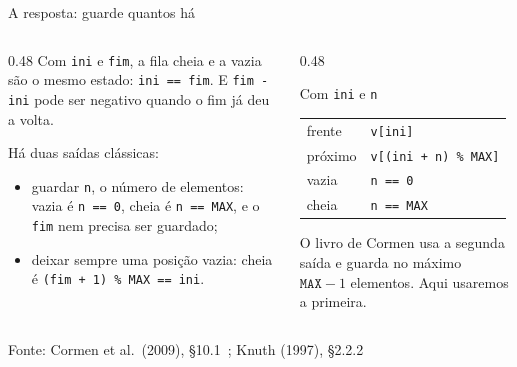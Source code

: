 \documentclass[aspectratio=169]{beamer}
\newcommand{\fonte}[1]{\vfill\hfill{\scriptsize\textcolor{UFSGray}{Fonte: #1}}}
\begin{document}
\begin{frame}{A resposta: guarde quantos há}
  \begin{columns}[T]
    \begin{column}{0.48\textwidth}
      \small Com \texttt{ini} e \texttt{fim}, a fila cheia e a vazia são o
      mesmo estado: \texttt{ini == fim}. E \texttt{fim - ini} pode ser
      negativo quando o fim já deu a volta.

      \medskip
      Há duas saídas clássicas:
      \begin{itemize}
        \item guardar \texttt{n}, o número de elementos: vazia é
          \texttt{n == 0}, cheia é \texttt{n == MAX}, e o \texttt{fim}
          nem precisa ser guardado;
        \item deixar sempre uma posição vazia: cheia é
          \texttt{(fim + 1) \% MAX == ini}.
      \end{itemize}
    \end{column}
    \begin{column}{0.48\textwidth}
      \begin{block}{Com \texttt{ini} e \texttt{n}}
        \small
        \begin{tabular}{@{}ll@{}}
          frente      & \texttt{v[ini]}\\
          próximo     & \texttt{v[(ini + n) \% MAX]}\\
          vazia       & \texttt{n == 0}\\
          cheia       & \texttt{n == MAX}\\
        \end{tabular}
      \end{block}
      \small O livro de Cormen usa a segunda saída e guarda no máximo
      $\texttt{MAX} - 1$ elementos. Aqui usaremos a primeira.
    \end{column}
  \end{columns}
  \fonte{Cormen et al.\ (2009), §10.1~\cite{cormen2009introduction};
    Knuth (1997), §2.2.2~\cite{knuth1997art}}
\end{frame}
\end{document}
